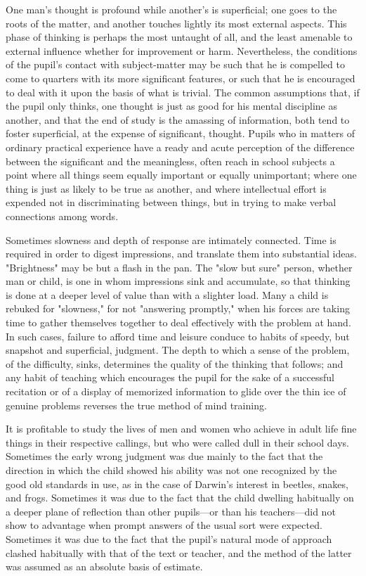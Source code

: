 \documentclass[showtrims,ustradepaper]{memoir}
\begin{document}
One man's thought is profound while another's is superficial; one goes
to the roots of the matter, and another touches lightly its most
external aspects. This phase of thinking is perhaps the most untaught of
all, and the least amenable to external influence whether for
improvement or harm. Nevertheless, the conditions of the pupil's contact
with subject-matter may be such that he is compelled to come to quarters
with its more significant features, or such that he is encouraged to
deal with it upon the basis of what is trivial. The common assumptions
that, if the pupil only thinks, one thought is just as good for his
mental discipline as another, and that the end of study is the amassing
of information, both tend to foster superficial, at the expense of
significant, thought. Pupils who in matters of ordinary practical
experience have a ready and acute perception of the difference between
the significant and the meaningless, often reach in school subjects a
point where all things seem equally important or equally unimportant;
where one thing is just as likely to be true as another, and where
intellectual effort is expended not in discriminating between things,
but in trying to make verbal connections among words.


Sometimes slowness and depth of response are intimately connected. Time
is required in order to digest impressions, and translate them into
substantial ideas. "Brightness" may be but a flash in the pan. The "slow
but sure" person, whether man or child, is one in whom impressions sink
and accumulate, so that thinking is
done
at a deeper level of value than with a slighter load. Many a child is
rebuked for "slowness," for not "answering promptly," when his forces
are taking time to gather themselves together to deal effectively with
the problem at hand. In such cases, failure to afford time and leisure
conduce to habits of speedy, but snapshot and superficial, judgment. The
depth to which a sense of the problem, of the difficulty, sinks,
determines the quality of the thinking that follows; and any habit of
teaching which encourages the pupil for the sake of a successful
recitation or of a display of memorized information to glide over the
thin ice of genuine problems reverses the true method of mind training.


It is profitable to study the lives of men and women who achieve in
adult life fine things in their respective callings, but who were called
dull in their school days. Sometimes the early wrong judgment was due
mainly to the fact that the direction in which the child showed his
ability was not one recognized by the good old standards in use, as in
the case of Darwin's interest in beetles, snakes, and frogs. Sometimes
it was due to the fact that the child dwelling habitually on a deeper
plane of reflection than other pupils---or than his teachers---did not
show to advantage when prompt answers of the usual sort were expected.
Sometimes it was due to the fact that the pupil's natural mode of
approach clashed habitually with that of the text or teacher, and the
method of the latter was assumed as an absolute basis of estimate.
\end{document}
